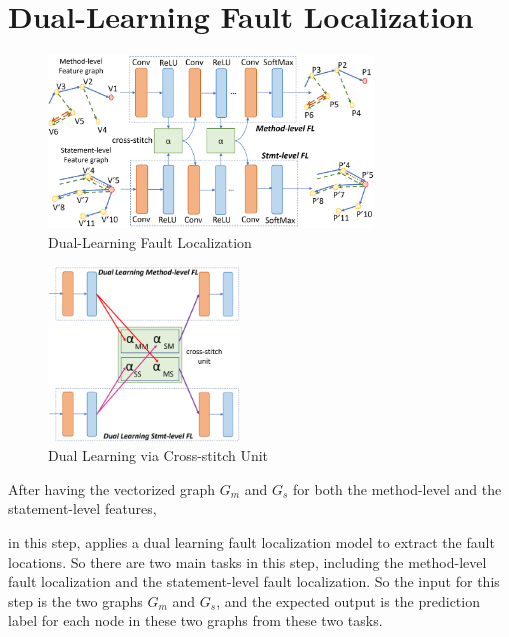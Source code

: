\section{Dual-Learning Fault Localization}

\begin{figure}[t]
	\centering
	\includegraphics[width=3.4in]{graphs/dual-learning.png}
	\caption{Dual-Learning Fault Localization}
	\label{dual-learning}
\end{figure}

\begin{figure}[t]
	\centering
	\includegraphics[width=2in]{graphs/cross-stitch.png}
	\caption{Dual Learning via Cross-stitch Unit}
	\label{dual-learning}
\end{figure}


After having the vectorized graph $G_m$ and $G_s$ for both the method-level and the statement-level features, 

in this step, \tool applies a dual learning fault localization model to extract the fault locations. So there are two main tasks in this step, including the method-level fault localization and the statement-level fault localization. So the input for this step is the two graphs $G_m$ and $G_s$, and the expected output is the prediction label for each node in these two graphs from these two tasks.

